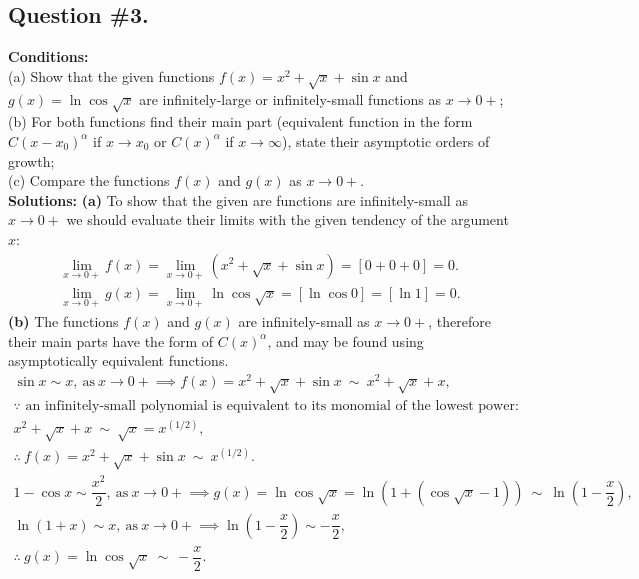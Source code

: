 \subsection*{\center Question \#3.}
{\bf Conditions:}\\
(a) Show that the given functions $f(x)=x^2+\sqrt{x}+\sin{x}$ and $g(x)=\ln{\cos{\sqrt{x}}}$ are infinitely-large or infinitely-small functions as $x\rightarrow0+$;\\
(b) For both functions find their main part (equivalent function in the form $C(x-x_0)^\alpha$ if $x\rightarrow x_0$ or $C(x)^\alpha$ if $x\rightarrow\infty$), state their asymptotic orders of growth;\\
(c) Compare the functions $f(x)$ and $g(x)$ as $x\rightarrow0+$.\\ [0.5cm]
{\bf Solutions:}
{\bf\flushleft (a)}
To show that the given are functions are infinitely-small as $x\rightarrow0+$ we should evaluate their limits with the given tendency of the argument $x$:
$$
\begin{array}{c}
\lim\limits_{x\rightarrow0+}f(x) = 
\lim\limits_{x\rightarrow0+}(x^2+\sqrt{x}+\sin{x}) =
\left[0+0+0\right] = 0. \\ [13pt]
\lim\limits_{x\rightarrow0+}g(x) = 
\lim\limits_{x\rightarrow0+}\ln{\cos{\sqrt{x}}} =
\left[\ln{\cos{0}}\right] = 
\left[\ln{1}\right] = 0.
\end{array}
$$
\newpage
{\bf\flushleft (b)}
The functions $f(x)$ and $g(x)$ are infinitely-small as $x\rightarrow0+$, therefore their main parts have the form of $C(x)^\alpha$, and may be found using asymptotically equivalent functions.
$$
\begin{array}{c}
\sin{x}\sim x,\ \text{as}\ x\rightarrow{0+} \implies
f(x)=x^2+\sqrt{x}+\sin{x}\ \sim\ x^2+\sqrt{x}+x, \\
\because \text{ an infinitely-small polynomial is equivalent to its monomial of the lowest power:} \\
x^2+\sqrt{x}+x\ \sim\ \sqrt{x}=x^{(1/2)}, \\
\therefore\ f(x)=x^2+\sqrt{x}+\sin{x}\ \sim\ x^{(1/2)}.\\ [0.4cm]
1-\cos{x}\sim \dfrac{x^2}{2},\ \text{as}\ x\rightarrow{0+} \implies
g(x)=\ln{\cos{\sqrt{x}}}=\ln{(1+(\cos{\sqrt{x}}-1))}\ \sim\ \ln{(1-\dfrac{x}{2})},\\
\ln{(1+x)}\sim x,\ \text{as}\ x\rightarrow{0+} \implies
\ln{(1-\dfrac{x}{2})}\sim -\dfrac{x}{2}, \\
\therefore\ g(x)=\ln{\cos{\sqrt{x}}}\ \sim\ -\dfrac{x}{2}.
\end{array}
$$
